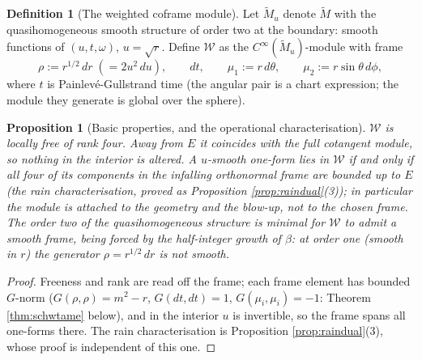 \documentclass[11pt]{article}
\newtheorem{proposition}[theorem]{Proposition}
\theoremstyle{definition}
\newtheorem{definition}[theorem]{Definition}
\newcommand{\shW}{\mathcal{W}}
\newcommand{\Mt}{\widetilde{M}}
\newcommand{\dtPG}{dt}
\begin{document}
\begin{definition}[The weighted coframe module]\label{def:W}
Let $\Mt_u$ denote $\Mt$ with the quasihomogeneous smooth structure of order two at the boundary: smooth functions of $(u, t, \omega)$, $u = \sqrt{r}$. Define $\shW$ as the $C^\infty(\Mt_u)$-module with frame
\[
\rho := r^{1/2}\,dr \;(= 2u^2\,du), \qquad \dtPG, \qquad \mu_1 := r\,d\theta, \qquad \mu_2 := r\sin\theta\,d\phi ,
\]
where $t$ is Painlev\'e-Gullstrand time (the angular pair is a chart expression; the module they generate is global over the sphere).
\end{definition}

\begin{proposition}[Basic properties, and the operational characterisation]\label{prop:Wframe}
$\shW$ is locally free of rank four. Away from $E$ it coincides with the full cotangent module, so nothing in the interior is altered. A $u$-smooth one-form lies in $\shW$ if and only if all four of its components in the infalling orthonormal frame are bounded up to $E$ (the rain characterisation, proved as Proposition \ref{prop:raindual}(3)); in particular the module is attached to the geometry and the blow-up, not to the chosen frame. The order two of the quasihomogeneous structure is minimal for $\shW$ to admit a smooth frame, being forced by the half-integer growth of $\beta$: at order one (smooth in $r$) the generator $\rho = r^{1/2}\,dr$ is not smooth.
\end{proposition}

\begin{proof}
Freeness and rank are read off the frame; each frame element has bounded $G$-norm ($G(\rho,\rho) = m^2 - r$, $G(\dtPG,\dtPG) = 1$, $G(\mu_i,\mu_i) = -1$: Theorem \ref{thm:schwtame} below), and in the interior $u$ is invertible, so the frame spans all one-forms there. The rain characterisation is Proposition \ref{prop:raindual}(3), whose proof is independent of this one.
\end{proof}
\end{document}
